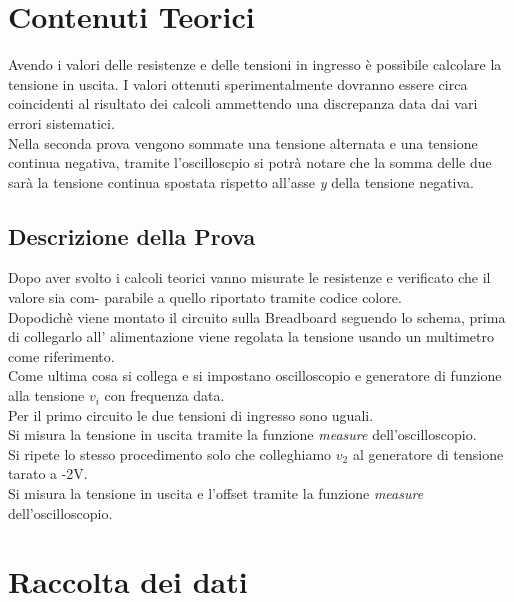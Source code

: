 \documentclass[12pt]{article}
\begin{document}
\section{Contenuti Teorici}
Avendo i valori delle resistenze e delle tensioni in ingresso è possibile calcolare la tensione in uscita.
I valori ottenuti sperimentalmente dovranno essere circa coincidenti al risultato dei calcoli ammettendo
una discrepanza data dai vari errori sistematici.\\
Nella seconda prova vengono sommate una tensione alternata e una tensione continua negativa, tramite l'oscilloscpio
si potrà notare che la somma delle due sarà la tensione continua spostata rispetto all'asse \textit{y} 
della tensione negativa.
\subsection{Descrizione della Prova}
Dopo aver svolto i calcoli teorici vanno misurate le resistenze e verificato che il valore sia com-
parabile a quello riportato tramite codice colore.\\
Dopodichè viene montato il circuito sulla Breadboard seguendo lo schema, prima di collegarlo
all’ alimentazione viene regolata la tensione usando un multimetro come riferimento.\\
Come ultima cosa si collega e si impostano oscilloscopio e generatore di funzione alla tensione $v_i$ con frequenza data.\\
Per il primo circuito le due tensioni di ingresso sono uguali.\\
Si misura la tensione in uscita tramite la funzione \textit{measure} dell'oscilloscopio.\\
Si ripete lo stesso procedimento solo che colleghiamo $v_2$ al generatore di tensione tarato a -2V.\\
Si misura la tensione in uscita e l'offset tramite la funzione \textit{measure} dell'oscilloscopio.\\
\section{Raccolta dei dati}
\end{document}
